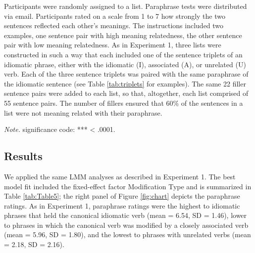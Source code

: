 Participants were randomly assigned to a list. Paraphrase tests were distributed via email. Participants rated on a scale from 1 to 7 how strongly the two sentences reflected each other’s meanings. The instructions included two examples, one sentence pair with high meaning relatedness, the other sentence pair with low meaning relatedness. 
As in Experiment 1, three lists were constructed in such a way that each included one of the sentence triplets of an idiomatic phrase, either with the idiomatic (I), associated (A), or unrelated (U) verb. Each of the three sentence triplets was paired with the same paraphrase of the idiomatic sentence (see Table \ref{tab:triplets} for examples). The same 22 filler sentence pairs were added to each list, so that, altogether, each list comprised of 55 sentence pairs. The number of fillers ensured that 60\% of the sentences in a list were not meaning related with their paraphrase. 



\begin{table}[]
\caption{\textit{Fixed Effects of the Predictors in the Linear Mixed-Effect Model for the Paraphrase Ratings in Experiment 2.}}
\label{tab:Table5}
\footnotesize{\textit{Note.} significance code: *** < .0001.}
\end{table}


\subsection{Results}

We applied the same LMM analyses as described in Experiment 1. The best model fit included the fixed-effect factor Modification Type and is summarized in Table \ref{tab:Table5}; the right panel of Figure \ref{fig:chart} depicts the paraphrase ratings. As in Experiment 1, paraphrase ratings were the highest to idiomatic phrases that held the canonical idiomatic verb (mean = 6.54, SD = 1.46), lower to phrases in which the canonical verb was modified by a closely associated verb (mean = 5.96, SD = 1.80), and the lowest to phrases with unrelated verbs (mean = 2.18, SD = 2.16). 

